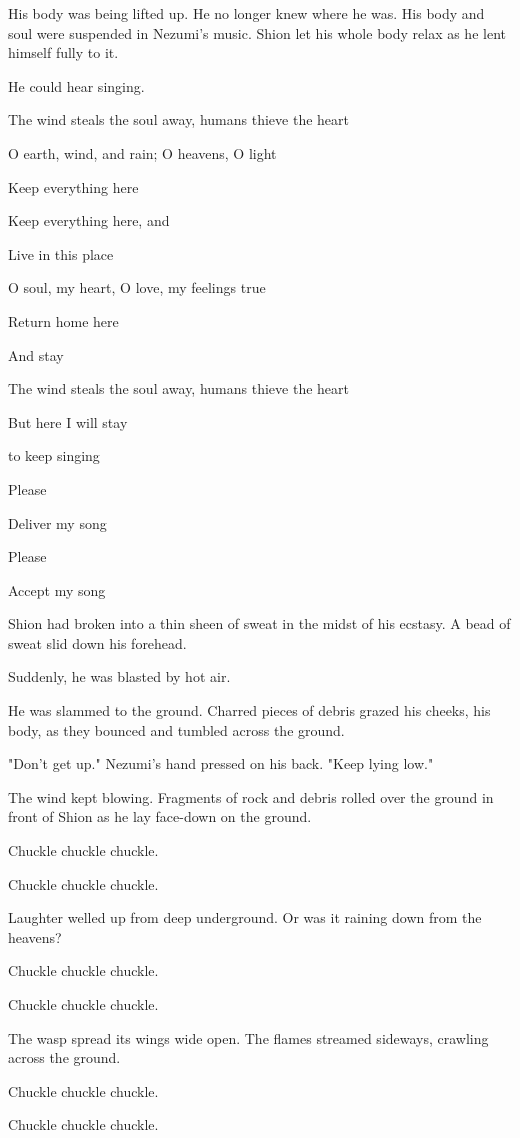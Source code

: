 His body was being lifted up. He no longer knew where he was. His body
and soul were suspended in Nezumi's music. Shion let his whole body
relax as he lent himself fully to it.

He could hear singing.

The wind steals the soul away, humans thieve the heart

O earth, wind, and rain; O heavens, O light

Keep everything here

Keep everything here, and

Live in this place

O soul, my heart, O love, my feelings true

Return home here

And stay

The wind steals the soul away, humans thieve the heart

But here I will stay

to keep singing

Please

Deliver my song

Please

Accept my song

Shion had broken into a thin sheen of sweat in the midst of his ecstasy.
A bead of sweat slid down his forehead.

Suddenly, he was blasted by hot air.

He was slammed to the ground. Charred pieces of debris grazed his
cheeks, his body, as they bounced and tumbled across the ground.

"Don't get up." Nezumi's hand pressed on his back. "Keep lying low."

The wind kept blowing. Fragments of rock and debris rolled over the
ground in front of Shion as he lay face-down on the ground.

Chuckle chuckle chuckle.

Chuckle chuckle chuckle.

Laughter welled up from deep underground. Or was it raining down from
the heavens?

Chuckle chuckle chuckle.

Chuckle chuckle chuckle.

The wasp spread its wings wide open. The flames streamed sideways,
crawling across the ground.

Chuckle chuckle chuckle.

Chuckle chuckle chuckle.

